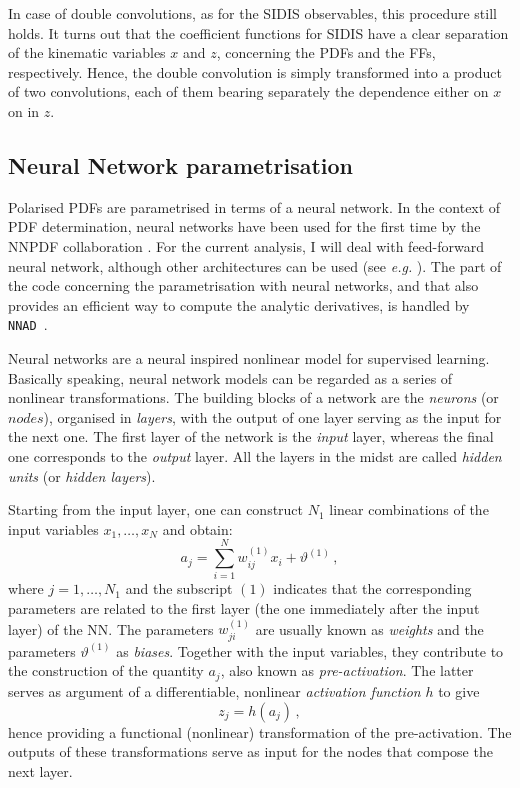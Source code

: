 In case of double convolutions, as for the SIDIS observables, this procedure still holds. It turns out that the coefficient functions for SIDIS have a clear separation of the kinematic variables $x$ and $z$, concerning the PDFs and the FFs, respectively. Hence, the double convolution is simply transformed into a product of two convolutions, each of them bearing separately the dependence either on $x$ on in $z$. 


\subsection{Neural Network parametrisation}
\label{sec:NN}

Polarised PDFs are parametrised in terms of a neural network. In the context of PDF determination, neural networks have been used for the first time by the NNPDF collaboration \cite{Forte:2002fg}. For the current analysis, I will deal with feed-forward neural network, although other architectures can be used (see \textit{e.g.} \cite{Bishop}). The part of the code concerning the parametrisation with neural networks, and that also provides an efficient way to compute the analytic derivatives, is handled by \texttt{NNAD}~\cite{AbdulKhalek:2020uza}.%

Neural networks are a neural inspired nonlinear model for supervised learning. Basically speaking, neural network models can be regarded as a series of nonlinear transformations. The building blocks of a network are the \textit{neurons} (or $\textit{nodes}$), organised in \textit{layers}, with the output of one layer serving as the input for the next one. The first layer of the network is the \textit{input} layer, whereas the final one corresponds to the \textit{output} layer. All the layers in the midst are called \textit{hidden units} (or \textit{hidden layers}).\par
Starting from the input layer, one can construct $N_1$ linear combinations of the input variables $x_1, \dots, x_N$ and obtain:
\begin{equation}
  a_j = \sum_{i=1}^{N} w_{ij}^{(1)} x_i + \vartheta^{(1)}\,,
  \label{eq:activation}
\end{equation}
where $j=1,\dots,N_1$ and the subscript $(1)$ indicates that the corresponding parameters are related to the first layer (the one immediately after the input layer) of the NN. The parameters $w^{(1)}_{ji}$ are usually known as \textit{weights} and the parameters $\vartheta^{(1)}$ as \textit{biases}. Together with the input variables, they contribute to the construction of the quantity $a_j$, also known as \textit{pre-activation}. The latter serves as argument of a differentiable, nonlinear \textit{activation function} $h$ to give
\begin{equation}
  z_{j} = h(a_j)\,,
\end{equation}
hence providing a functional (nonlinear) transformation of the pre-activation. The outputs of these transformations serve as input for the nodes that compose the next layer.%

